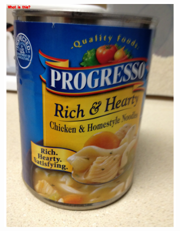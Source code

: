\documentclass[sigconf]{acmart}
\begin{document}
\begin{figure}[hbp]
        \centering
        \begin{subfigure}[b]{0.4\columnwidth}
                \includegraphics[width=\textwidth]{images/object_1.pdf}  
        \end{subfigure}%
        ~ 
        \begin{subfigure}[b]{0.4\columnwidth}

\end{subfigure}
\end{figure}
\end{document}
